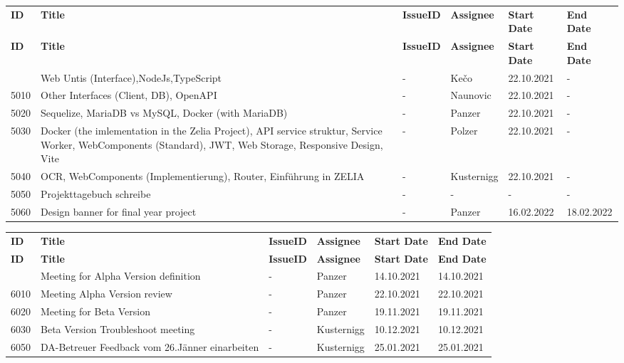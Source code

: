 \begin{longtable}{|p{}|p{}|p{}|p{}|p{}|p{}|} \hline
    \textbf{ID} & \textbf{Title} & \textbf{Issue\-ID} & \textbf{Assignee} & \textbf{Start Date} & \textbf{End\- Date} \\ \hhline{|=|=|=|=|=|=|}
    \endfirsthead
    \hline
    \textbf{ID} & \textbf{Title} & \textbf{Issue\-ID} & \textbf{Assignee} & \textbf{Start Date} & \textbf{End\- Date} \\ \hhline{|=|=|=|=|=|=|}
    \endhead
    5000 & Web Untis (Interface),NodeJs,TypeScript & - & Kečo & 22.10.2021 & - \\ \hline
    5010 & Other Interfaces (Client, DB), OpenAPI & - & Naunovic & 22.10.2021 & - \\ \hline
    5020 & Sequelize, MariaDB vs MySQL, Docker (with MariaDB) & - & Panzer & 22.10.2021 & - \\ \hline
    5030 & Docker (the imlementation in the Zelia Project), API service struktur, Service Worker, WebComponents (Standard), JWT, Web Storage, Responsive Design, Vite & - & Polzer & 22.10.2021 & - \\ \hline
    5040 & OCR, WebComponents (Implementierung), Router, Einführung in ZELIA & - & Kusternigg & 22.10.2021 & - \\ \hline
    5050 & Projekttagebuch schreibe & - & - & - & - \\ \hline
    5060 & Design banner for final year project & - & Panzer & 16.02.2022 & 18.02.2022 \\ \hline
\end{longtable}

\begin{longtable}{|p{}|p{}|p{}|p{}|p{}|p{}|} \hline
    \textbf{ID} & \textbf{Title} & \textbf{Issue\-ID} & \textbf{Assignee} & \textbf{Start Date} & \textbf{End\- Date} \\ \hhline{|=|=|=|=|=|=|}
    \endfirsthead
    \hline
    \textbf{ID} & \textbf{Title} & \textbf{Issue\-ID} & \textbf{Assignee} & \textbf{Start Date} & \textbf{End\- Date} \\ \hhline{|=|=|=|=|=|=|}
    \endhead
    6000 & Meeting for Alpha Version definition  & - & Panzer & 14.10.2021 & 14.10.2021 \\ \hline
    6010 & Meeting Alpha Version review  & - & Panzer & 22.10.2021 & 22.10.2021 \\ \hline
    6020 & Meeting for Beta Version & - & Panzer & 19.11.2021 & 19.11.2021 \\ \hline
    6030 & Beta Version Troubleshoot meeting & - & Kusternigg & 10.12.2021 & 10.12.2021 \\ \hline
    6050 & DA-Betreuer Feedback vom 26.Jänner einarbeiten & - & Kusternigg & 25.01.2021 & 25.01.2021 \\ \hline
\end{longtable}

